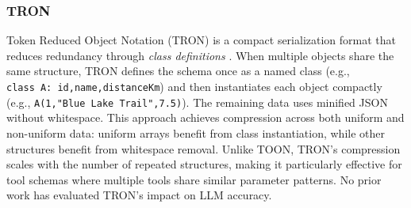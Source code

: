\documentclass[10pt,twocolumn,letterpaper]{article}
\begin{document}
\subsubsection{TRON}

Token Reduced Object Notation (TRON) is a compact serialization format that reduces redundancy through \textit{class definitions} \citep{tron-format/tron-javascript_2026, TRON_Format_2026}. When multiple objects share the same structure, TRON defines the schema once as a named class (e.g., \texttt{class~A:~id,name,distanceKm}) and then instantiates each object compactly (e.g., \texttt{A(1,"Blue~Lake~Trail",7.5)}). The remaining data uses minified JSON without whitespace. This approach achieves compression across both uniform and non-uniform data: uniform arrays benefit from class instantiation, while other structures benefit from whitespace removal. Unlike TOON, TRON's compression scales with the number of repeated structures, making it particularly effective for tool schemas where multiple tools share similar parameter patterns. No prior work has evaluated TRON's impact on LLM accuracy.
\end{document}
